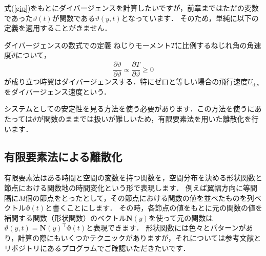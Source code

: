 \documentclass{jarticle}
\begin{document}
式(\ref{gip})をもとにダイバージェンスを計算したいですが，前章まではただの変数であった$\vartheta(t)$が関数である$\vartheta(y,t)$となっています．
そのため，単純に以下の定義を適用することがきません．
\begin{itembox}[l]{ダイバージェンスの数式での定義}
    ねじりモーメント$T$に比例するねじれ角の角速度$\ddot{\vartheta}$について，
    \begin{equation*}
        \frac{\partial \ddot{\vartheta}}{\partial \vartheta} \propto \frac{\partial T}{\partial \vartheta} \geq 0
    \end{equation*}
    が成り立つ時翼はダイバージェンスする．特にゼロと等しい場合の飛行速度$U_\mathrm{div}$をダイバージェンス速度という．
\end{itembox}
システムとしての安定性を見る方法を使う必要があります．この方法を使うにあたっては$\vartheta$が関数のままでは扱いが難しいため，有限要素法を用いた離散化を行います．

\subsection{有限要素法による離散化}

有限要素法はある時間と空間の変数を持つ関数を，空間分布を決める形状関数と節点における関数地の時間変化という形で表現します．
例えば翼幅方向に等間隔に$M$個の節点をとったとして，その節点における関数の値を並べたものを列ベクトル$\bm{\vartheta}(t)$と書くことにします．
その時，各節点の値をもとに元の関数の値を補間する関数（形状関数）のベクトル$\bm{N}(y)$を使って元の関数は$\vartheta(y,t) = \bm{N}(y)^\top\bm{\vartheta}(t)$と表現できます．
形状関数には色々とパターンがあり，計算の際にもいくつかテクニックがありますが，それについては参考文献とリポジトリにあるプログラムでご確認いただきたいです．
\end{document}
